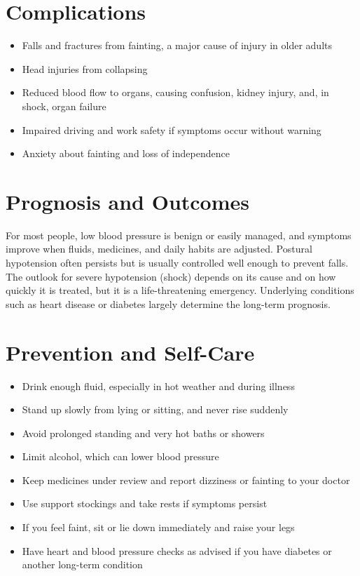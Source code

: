\section*{Complications}
\begin{itemize}
    \item Falls and fractures from fainting, a major cause of injury in older adults
    \item Head injuries from collapsing
    \item Reduced blood flow to organs, causing confusion, kidney injury, and, in shock, organ failure
    \item Impaired driving and work safety if symptoms occur without warning
    \item Anxiety about fainting and loss of independence
\end{itemize}

\section*{Prognosis and Outcomes}
For most people, low blood pressure is benign or easily managed, and symptoms improve when fluids, medicines, and daily habits are adjusted. Postural hypotension often persists but is usually controlled well enough to prevent falls. The outlook for severe hypotension (shock) depends on its cause and on how quickly it is treated, but it is a life-threatening emergency. Underlying conditions such as heart disease or diabetes largely determine the long-term prognosis.

\section*{Prevention and Self-Care}
\begin{itemize}
    \item Drink enough fluid, especially in hot weather and during illness
    \item Stand up slowly from lying or sitting, and never rise suddenly
    \item Avoid prolonged standing and very hot baths or showers
    \item Limit alcohol, which can lower blood pressure
    \item Keep medicines under review and report dizziness or fainting to your doctor
    \item Use support stockings and take rests if symptoms persist
    \item If you feel faint, sit or lie down immediately and raise your legs
    \item Have heart and blood pressure checks as advised if you have diabetes or another long-term condition
\end{itemize}

